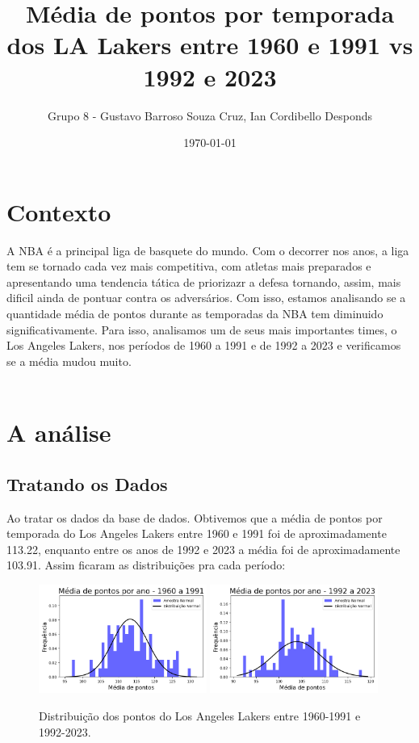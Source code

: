 \documentclass{article}
\title{\textbf{
    Média de pontos por temporada dos LA Lakers entre 1960 e 1991 vs 1992 e 2023
}}
\author{Grupo 8 - Gustavo Barroso Souza Cruz, Ian Cordibello Desponds}
\date{\today}
\begin{document}
    \maketitle
    \section*{Contexto}
    
    A NBA é a principal liga de basquete do mundo. Com o decorrer nos anos, a liga tem se tornado cada vez
    mais competitiva, com atletas mais preparados e apresentando uma tendencia tática de priorizazr a defesa
    tornando, assim, mais dificil ainda de pontuar contra os adversários. Com isso, estamos analisando se 
    a quantidade média de pontos durante as temporadas da NBA tem diminuido significativamente. Para isso,
    analisamos um de seus mais importantes times, o Los Angeles Lakers, nos períodos de 1960 a 1991 e de 1992 
    a 2023 e verificamos se a média mudou muito.\\
    \\

    \section*{A análise}

    \subsection*{Tratando os Dados}

    Ao tratar os dados da base de dados. Obtivemos que a média de pontos por temporada do Los Angeles Lakers 
    entre 1960 e 1991 foi de aproximadamente 113.22, enquanto entre os anos de 1992 e 2023 a média foi de
    aproximadamente 103.91.
    Assim ficaram as distribuições pra cada período:

    \begin{figure}[h]
        \centering
        \includegraphics[width=0.49\textwidth]{pontos_60_91.png}
        \hfill
        \includegraphics[width=0.49\textwidth]{pontos_92_23.png}
        \caption{Distribuição dos pontos do Los Angeles Lakers entre 1960-1991 e 1992-2023.}
    \end{figure}
    
\end{document}

